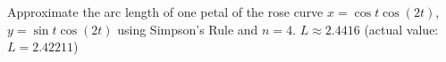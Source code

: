 {Approximate the arc length of one petal of the rose curve $x=\cos t\cos(2t)$,\quad  $y=\sin t\cos(2t)$ using Simpson's Rule and $n=4$.}
{$L\approx 2.4416$ (actual value: $L=2.42211$) }
